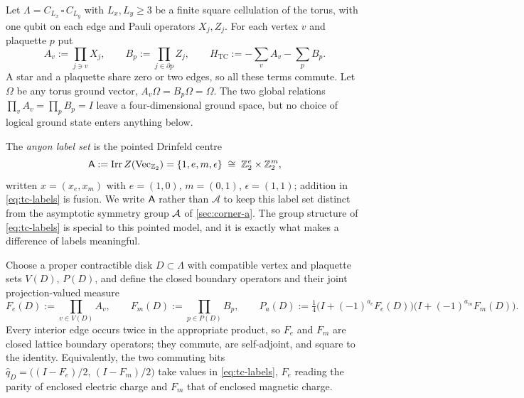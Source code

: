 \begin{definition}\label{def:toric-registers}
Let $\Lambda=C_{L_x}\,\square\,C_{L_y}$ with $L_x,L_y\ge3$ be a finite square
cellulation of the torus, with one qubit on each edge and Pauli operators
$X_j,Z_j$. For each vertex $v$ and plaquette $p$ put
\begin{equation}
  A_v:=\prod_{j\ni v}X_j,\qquad
  B_p:=\prod_{j\in\partial p}Z_j,\qquad
  H_{\mathrm{TC}}:=-\sum_v A_v-\sum_p B_p .
  \label{eq:tc-hamiltonian}
\end{equation}
A star and a plaquette share zero or two edges, so all these terms commute.
Let $\Omega$ be any torus ground vector, $A_v\Omega=B_p\Omega=\Omega$. The two
global relations $\prod_vA_v=\prod_pB_p=I$ leave a four-dimensional ground
space, but no choice of logical ground state enters anything below.

The \emph{anyon label set} is the pointed Drinfeld centre
\begin{equation}
  \mathsf{A}:=\operatorname{Irr}Z(\operatorname{Vec}_{\mathbb{Z}_2})
   =\{1,e,m,\epsilon\}\;\cong\;\mathbb{Z}_2^{e}\times\mathbb{Z}_2^{m},
  \label{eq:tc-labels}
\end{equation}
written $x=(x_e,x_m)$ with $e=(1,0)$, $m=(0,1)$, $\epsilon=(1,1)$; addition in
\eqref{eq:tc-labels} is fusion. We write $\mathsf{A}$ rather than $\mathcal A$ to
keep this label set distinct from the asymptotic symmetry group $\mathcal{A}$ of
\cref{sec:corner-a}. The group structure of \eqref{eq:tc-labels} is special to
this pointed model, and it is exactly what makes a difference of labels
meaningful.

Choose a proper contractible disk $D\subset\Lambda$ with compatible vertex and
plaquette sets $V(D)$, $P(D)$, and define the closed boundary operators and
their joint projection-valued measure
\begin{equation}
  F_e(D):=\prod_{v\in V(D)}A_v,
  \qquad
  F_m(D):=\prod_{p\in P(D)}B_p,
  \qquad
  P_a(D):=\tfrac14\bigl(I+(-1)^{a_e}F_e(D)\bigr)
                 \bigl(I+(-1)^{a_m}F_m(D)\bigr).
  \label{eq:tc-pvm}
\end{equation}
Every interior edge occurs twice in the appropriate product, so $F_e$ and
$F_m$ are closed lattice boundary operators; they commute, are self-adjoint,
and square to the identity. Equivalently, the two commuting bits
$\hat q_D=\bigl((I-F_e)/2,\,(I-F_m)/2\bigr)$ take values in
\eqref{eq:tc-labels}, $F_e$ reading the parity of enclosed electric charge and
$F_m$ that of enclosed magnetic charge.


\end{definition}
